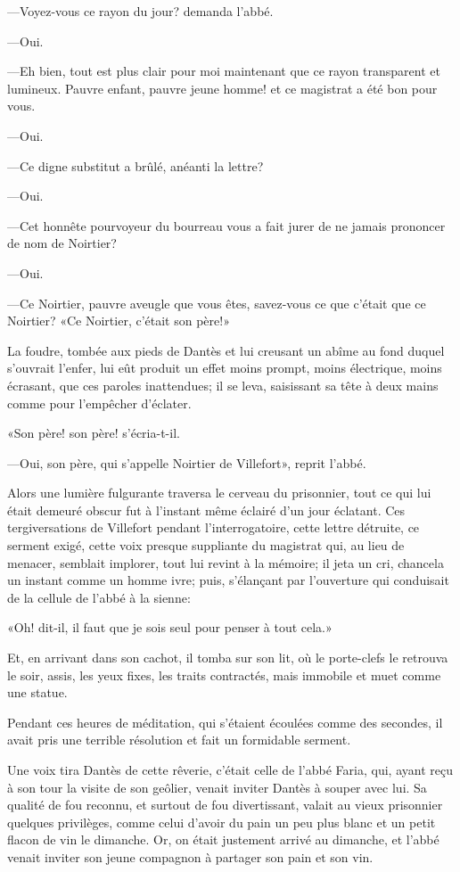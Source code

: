 —Voyez-vous ce rayon du jour? demanda l'abbé.

—Oui.

—Eh bien, tout est plus clair pour moi maintenant que ce rayon transparent et lumineux. Pauvre enfant, pauvre jeune homme! et ce magistrat a été bon pour vous.

—Oui.

—Ce digne substitut a brûlé, anéanti la lettre?

—Oui.

—Cet honnête pourvoyeur du bourreau vous a fait jurer de ne jamais prononcer de nom de Noirtier?

—Oui.

—Ce Noirtier, pauvre aveugle que vous êtes, savez-vous ce que c'était que ce Noirtier? «Ce Noirtier, c'était son père!»

La foudre, tombée aux pieds de Dantès et lui creusant un abîme au fond duquel s'ouvrait l'enfer, lui eût produit un effet moins prompt, moins électrique, moins écrasant, que ces paroles inattendues; il se leva, saisissant sa tête à deux mains comme pour l'empêcher d'éclater.

«Son père! son père! s'écria-t-il.

—Oui, son père, qui s'appelle Noirtier de Villefort», reprit l'abbé.

Alors une lumière fulgurante traversa le cerveau du prisonnier, tout ce qui lui était demeuré obscur fut à l'instant même éclairé d'un jour éclatant. Ces tergiversations de Villefort pendant l'interrogatoire, cette lettre détruite, ce serment exigé, cette voix presque suppliante du magistrat qui, au lieu de menacer, semblait implorer, tout lui revint à la mémoire; il jeta un cri, chancela un instant comme un homme ivre; puis, s'élançant par l'ouverture qui conduisait de la cellule de l'abbé à la sienne:

«Oh! dit-il, il faut que je sois seul pour penser à tout cela.»

Et, en arrivant dans son cachot, il tomba sur son lit, où le porte-clefs le retrouva le soir, assis, les yeux fixes, les traits contractés, mais immobile et muet comme une statue.

Pendant ces heures de méditation, qui s'étaient écoulées comme des secondes, il avait pris une terrible résolution et fait un formidable serment.

Une voix tira Dantès de cette rêverie, c'était celle de l'abbé Faria, qui, ayant reçu à son tour la visite de son geôlier, venait inviter Dantès à souper avec lui. Sa qualité de fou reconnu, et surtout de fou divertissant, valait au vieux prisonnier quelques privilèges, comme celui d'avoir du pain un peu plus blanc et un petit flacon de vin le dimanche. Or, on était justement arrivé au dimanche, et l'abbé venait inviter son jeune compagnon à partager son pain et son vin.

